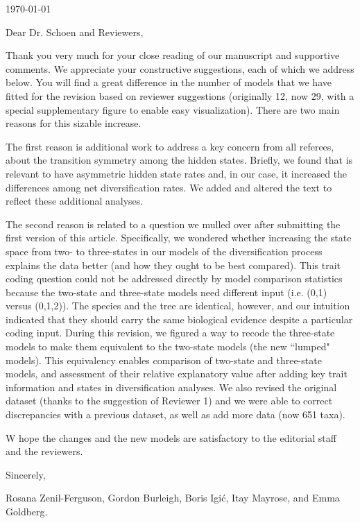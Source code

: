 \documentclass[11pt]{article}
\begin{document}
\hfill \today

Dear Dr. Schoen and Reviewers,

\medskip
Thank you very much for your close reading of our manuscript and supportive comments. We appreciate your constructive suggestions, each of which we address below. You will find a great difference in the number of models that we have fitted for the revision based on reviewer suggestions (originally 12, now 29, with a special supplementary figure to enable easy visualization). There are two main reasons for this sizable increase. 

The first reason is additional work to address a key concern from all referees, about the transition symmetry among the hidden states. 
Briefly, we found that is relevant to have asymmetric hidden state rates and, in our case, it increased the differences among net diversification rates. 
We added and altered the text to reflect these additional analyses. 


The second reason is related to a question we mulled over after submitting the first version of this article. Specifically, we wondered whether increasing the state space from two- to three-states in our models of the diversification process explains the data better (and how they ought to be best compared). 
This  trait coding question could not be addressed directly by model comparison statistics because the two-state and three-state models need different input (i.e. (0,1) versus (0,1,2)). 
The species and the tree are identical, however, and our intuition indicated that they should carry the same biological evidence despite a particular coding input. 
During this revision, we figured a way to recode the three-state models to make them equivalent to the two-state models (the new ``lumped" models). 
This equivalency enables comparison of two-state and three-state models, and assessment of their relative explanatory value after adding key trait information and states in diversification analyses. 
We also revised the original dataset (thanks to the suggestion of Reviewer 1) and we were able to correct discrepancies with a previous dataset, as well as add more data (now 651 taxa).

W hope the changes and the new models are satisfactory to the editorial staff and the reviewers.

\medskip
Sincerely,

Rosana Zenil-Ferguson, Gordon Burleigh, Boris Igi\'c, Itay Mayrose, and Emma Goldberg.


\end{document}
